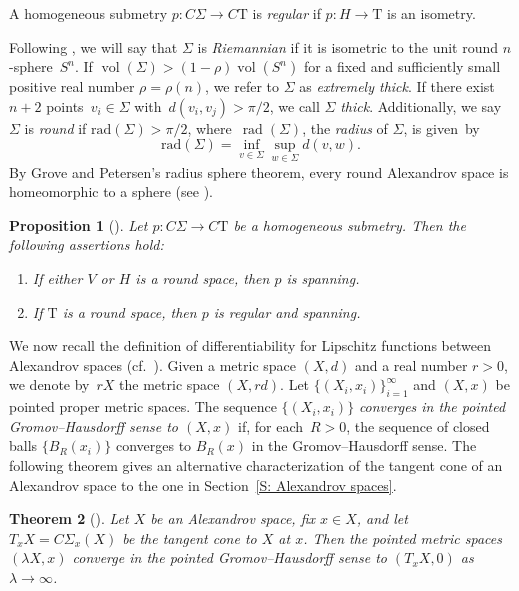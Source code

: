 \documentclass[10pt,a4paper]{amsart}
\numberwithin{equation}{section}
\newtheorem{thm}{Theorem}[section]
\newtheorem{prop}[thm]{Proposition}
\theoremstyle{definition}
\DeclareMathOperator{\vol}{vol}
\DeclareMathOperator{\rad}{rad}
\newcommand{\Sp}{S} %
\newcommand{\Tau}{\mathrm{T}}
\begin{document}
A homogeneous submetry $p\colon C\Sigma\to C\Tau$ is \emph{regular} if $p\colon H\to \Tau$ is an isometry.

Following \cite[Definition 2.5]{Lytchak}, we will say that $\Sigma$ is \emph{Riemannian} if it is isometric to the unit round $n$-sphere~$\Sp^n$. If $\vol(\Sigma)>(1-\rho)\vol(\Sp^n)$ for a fixed and sufficiently small positive real number $\rho=\rho(n)$, we refer to $\Sigma$ as \emph{extremely thick}. If there exist $n+2$ points~${v_i\in \Sigma}$ with~${d(v_i,v_j)>\pi/2}$, we call $\Sigma$ \emph{thick}. Additionally, we say $\Sigma$ is \emph{round} if $\mathrm{rad}(\Sigma)>\pi/2$, where~$\rad(\Sigma)$, the \emph{radius} of $\Sigma$, is given~by
\[
 	\mathrm{rad}(\Sigma) = \inf_{v\in \Sigma}\sup_{w\in \Sigma}d(v,w).
\]
By Grove and Petersen's radius sphere theorem, every round Alexandrov space is homeomorphic to a sphere (see \cite{GrovePetersen1993}).

\begin{prop}[]
\label{L: Base space of homogenous submetry is a disk, then p is regular}
Let $p\colon C\Sigma\to C\Tau$ be a homogeneous submetry. Then the following assertions hold:
\begin{enumerate}\itemsep=0pt
\item[$(1)$] If either $V$ or $H$ is a round space, then $p$ is spanning.
\item[$(2)$] If $\Tau$ is a round space, then $p$ is regular and spanning.
\end{enumerate}	
\end{prop}


We now recall the definition of differentiability for Lipschitz functions between Alexandrov spaces (cf.\ \cite[Section 3]{Lytchak}). Given a metric space $(X,d)$ and a real number $r>0$, we denote by~$rX$ the metric space $(X,rd)$.
Let $\{(X_i,x_i)\}_{i=1}^\infty$ and $(X,x)$ be pointed proper metric spaces.
The sequence $\{(X_i,x_i)\}$ \emph{converges in the pointed Gromov--Hausdorff sense to $(X,x)$} if, for each~${R>0}$, the sequence of closed balls $\{B_R(x_i)\}$ converges to $B_R(x)$ in the Gromov--Hausdorff sense. The following theorem gives an alternative characterization of the tangent cone of an Alexandrov space to the one in Section~\ref{S: Alexandrov spaces}.



\begin{thm}[]
Let $X$ be an Alexandrov space, fix $x\in X$, and let $T_xX=C\Sigma_x(X)$ be the tangent cone to $X$ at $x$.
Then the pointed metric spaces $(\lambda X,x)$ converge in the pointed Gromov--Hausdorff sense to $(T_xX, 0)$ as $\lambda\to \infty$.
\end{thm}
\end{document}
